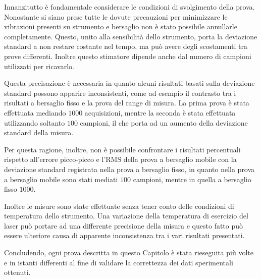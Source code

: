 Innanzitutto è fondamentale considerare le condizioni di svolgimento della prova. Nonostante si siano prese tutte le dovute precauzioni per minimizzare le vibrazioni presenti su strumento e bersaglio non è stato possibile annullarle completamente. Questo, unito alla sensibilità dello strumento, porta la deviazione standard a non restare costante nel tempo, ma può avere degli scostamenti tra prove differenti. Inoltre questo stimatore dipende anche dal numero di campioni utilizzati per ricavarlo. 

Questa precisazione è necessaria in quanto alcuni risultati basati sulla deviazione standard possono apparire inconsistenti, come ad esempio il contrasto tra i risultati a bersaglio fisso e la prova del range di misura. La prima prova è stata effettuata mediando $1000$ acquisizioni, mentre la seconda è stata effettuata utilizzando soltanto $100$ campioni, il che porta ad un aumento della deviazione standard della misura. 

Per questa ragione, inoltre, non è possibile confrontare i risultati percentuali rispetto all'errore picco-picco e l'RMS della prova a bersaglio mobile con la deviazione standard registrata nella prova a bersaglio fisso, in quanto nella prova a bersaglio mobile sono stati mediati $100$ campioni, mentre in quella a bersaglio fisso $1000$.

Inoltre le misure sono state effettuate senza tener conto delle condizioni di temperatura dello strumento. Una variazione della temperatura di esercizio del laser può portare ad una differente precisione della misura e questo fatto può essere ulteriore causa di apparente inconsistenza tra i vari risultati presentati.

Concludendo, ogni prova descritta in questo Capitolo è stata rieseguita più volte e in istanti differenti al fine di validare la correttezza dei dati sperimentali ottenuti.
